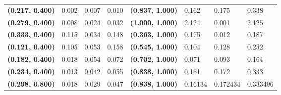 \begin{table}[h]
{\begin{tabular}{@{}clllc|lll@{}}
\textbf{(0.217, 0.400)}   & 0.002                 & 0.007                   & 0.010                   & \textbf{(0.837, 1.000)}   & 0.162                 & 0.175                   & 0.338                   \\
\textbf{(0.279, 0.400)}   & 0.008                 & 0.024                   & 0.032                   & \textbf{(1.000, 1.000)}   & 2.124                 & 0.001                   & 2.125                   \\
\textbf{(0.333, 0.400)}   & 0.115                 & 0.034                   & 0.148                   & \textbf{(0.363, 1.000)}   & 0.175                 & 0.012                   & 0.187                   \\
\textbf{(0.121, 0.400)}   & 0.105                 & 0.053                   & 0.158                   & \textbf{(0.545, 1.000)}   & 0.104                 & 0.128                   & 0.232                   \\
\textbf{(0.182, 0.400)}   & 0.018                 & 0.054                   & 0.072                   & \textbf{(0.702, 1.000)}   & 0.071                 & 0.093                   & 0.164                   \\
\textbf{(0.234, 0.400)}   & 0.013                 & 0.042                   & 0.055                   & \textbf{(0.838, 1.000)}   & 0.161                 & 0.172                   & 0.333                   \\
\textbf{(0.298, 0.800)}   & 0.018                 & 0.029                   & 0.047                   & \textbf{(0.838, 1.000)}   & 0.16134               & 0.172434                & 0.333496                \\ \bottomrule
\end{tabular}%
}
\end{table}

